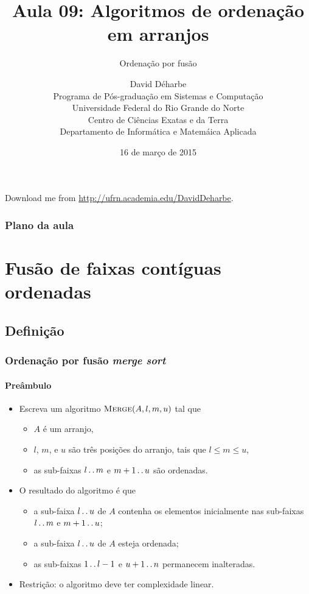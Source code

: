 \documentclass{beamer}
\title{Aula 09: Algoritmos de ordenação em arranjos}
\subtitle{Ordenação por fusão}
\author{David Déharbe \\
  Programa de Pós-graduação em Sistemas e Computação \\
  Universidade Federal do Rio Grande do Norte \\
  Centro de Ciências Exatas e da Terra \\
  Departamento de Informática e Matemáica Aplicada}
\date{16 de março de 2015}
\begin{document}
\begin{frame}
  \titlepage
  Download me from \url{http://ufrn.academia.edu/DavidDeharbe}.
\end{frame}

\begin{frame}
  \frametitle{Plano da aula}
  \tableofcontents
\end{frame}

\section{Fusão de faixas contíguas ordenadas}

\subsection{Definição}

\begin{frame}

  \frametitle{Ordenação por fusão \textit{merge sort}}
  \framesubtitle{Preâmbulo}

\begin{itemize}

\item Escreva um algoritmo $\textnormal{\scshape Merge}(A, l, m, u)$ tal que
\begin{itemize}
\item $A$ é um arranjo,
\item $l$, $m$, e $u$ são três posições do arranjo, tais que $l \le m \le u$,
\item as sub-faixas $l \mathinner{\ldotp\ldotp} m$ e $m+1 \mathinner{\ldotp\ldotp} u$ são ordenadas.
\end{itemize}
\item O resultado do algoritmo é que 
\begin{itemize}
\item a sub-faixa $l \mathinner{\ldotp\ldotp} u$ de $A$ contenha os elementos inicialmente 
  nas sub-faixas $l \mathinner{\ldotp\ldotp} m$ e $m+1 \mathinner{\ldotp\ldotp} u$;
\item a sub-faixa $l \mathinner{\ldotp\ldotp} u$ de $A$ esteja ordenada;
\item as sub-faixas $1 \mathinner{\ldotp\ldotp} l-1$ e $u+1 \mathinner{\ldotp\ldotp} n$ permanecem inalteradas.
\end{itemize}
\item Restrição: o algoritmo deve ter complexidade linear.

\end{itemize}

\end{frame}
\end{document}
